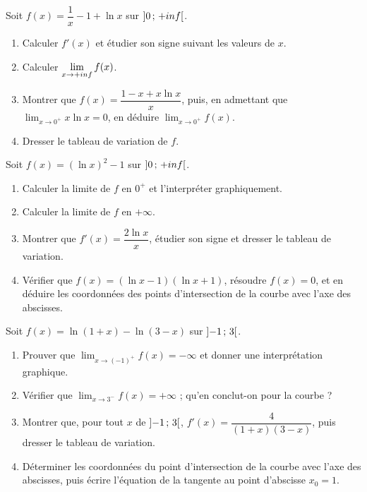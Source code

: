 \begin{annales}
Soit $f(x) = \dfrac1x-1+\ln x$ sur $\left]0\,;\,+inf\right[$.
\begin{enumerate}[label=\textbf{\alph*)}, leftmargin=*, itemsep=0.15em]
  \item Calculer $f'(x)$ et étudier son signe suivant les valeurs de $x$.
  \item Calculer $\limpinf f(x)$.
  \item Montrer que $f(x) = \dfrac{1-x+x\ln x}{x}$, puis, en admettant que
        $\displaystyle\lim_{x \to 0^{+}} x\ln x = 0$, en déduire
        $\displaystyle\lim_{x \to 0^{+}} f(x)$.
  \item Dresser le tableau de variation de $f$.
\end{enumerate}

Soit $f(x) = \left(\ln x\right)^{2}-1$ sur $\left]0\,;\,+inf\right[$.
\begin{enumerate}[label=\textbf{\alph*)}, leftmargin=*, itemsep=0.15em]
  \item Calculer la limite de $f$ en $0^{+}$ et l'interpréter
        graphiquement.
  \item Calculer la limite de $f$ en $+\infty$.
  \item Montrer que $f'(x) = \dfrac{2\ln x}{x}$, étudier son signe et
        dresser le tableau de variation.
  \item Vérifier que $f(x) = (\ln x-1)(\ln x+1)$, résoudre $f(x) = 0$, et en
        déduire les coordonnées des points d'intersection de la courbe avec
        l'axe des abscisses.
\end{enumerate}

Soit $f(x) = \ln(1+x)-\ln(3-x)$ sur $\left]-1\,;\,3\right[$.
\begin{enumerate}[label=\textbf{\alph*)}, leftmargin=*, itemsep=0.15em]
  \item Prouver que $\displaystyle\lim_{x \to (-1)^{+}} f(x) = -\infty$ et
        donner une interprétation graphique.
  \item Vérifier que $\displaystyle\lim_{x \to 3^{-}} f(x) = +\infty$ ;
        qu'en conclut-on pour la courbe ?
  \item Montrer que, pour tout $x$ de $\left]-1\,;\,3\right[$,
        $f'(x) = \dfrac{4}{(1+x)(3-x)}$, puis dresser le tableau de
        variation.
  \item Déterminer les coordonnées du point d'intersection de la courbe avec
        l'axe des abscisses, puis écrire l'équation de la tangente au point
        d'abscisse $x_{0} = 1$.
\end{enumerate}


\end{annales}
